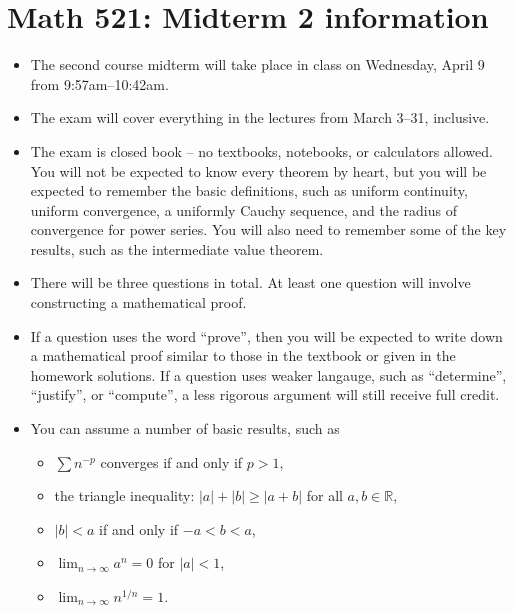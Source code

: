 \documentclass[12pt]{article}
\newcommand{\R}{\mathbb{R}}
\begin{document}
\section*{Math 521: Midterm 2 information}
\begin{itemize}
  \item The second course midterm will take place in class on Wednesday, April 9
    from 9:57am--10:42am.
  \item The exam will cover everything in the lectures from March 3--31,
    inclusive.
  \item The exam is closed book -- no textbooks, notebooks, or calculators
    allowed. You will not be expected to know every theorem by heart, but you
    will be expected to remember the basic definitions, such as uniform
    continuity, uniform convergence, a uniformly Cauchy sequence, and the
    radius of convergence for power series. You will also need to remember some
    of the key results, such as the intermediate value theorem.
  \item There will be three questions in total. At least one question will
    involve constructing a mathematical proof.
  \item If a question uses the word ``prove'', then you will be expected to
    write down a mathematical proof similar to those in the textbook or given in
    the homework solutions. If a question uses weaker langauge, such as
    ``determine'', ``justify'', or ``compute'', a less rigorous argument will
    still receive full credit.
  \item You can assume a number of basic results, such as
    \begin{itemize}
      \item $\sum n^{-p}$ converges if and only if $p>1$,
      \item the triangle inequality: $|a|+|b|\ge |a+b|$ for all $a,b\in \R$,
      \item $|b|<a$ if and only if $-a<b<a$,
      \item $\lim_{n\to \infty} a^n= 0$ for $|a|<1$,
      \item $\lim_{n\to \infty} n^{1/n} = 1$.
    \end{itemize}
\end{itemize}
\end{document}
